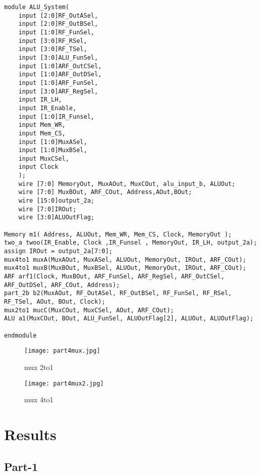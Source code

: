 \documentclass[12pt]{article}
\begin{document}
\begin{lstlisting}
module ALU_System(
    input [2:0]RF_OutASel,
    input [2:0]RF_OutBSel,
    input [1:0]RF_FunSel,
    input [3:0]RF_RSel,
    input [3:0]RF_TSel,
    input [3:0]ALU_FunSel,
    input [1:0]ARF_OutCSel,
    input [1:0]ARF_OutDSel,
    input [1:0]ARF_FunSel,
    input [3:0]ARF_RegSel,
    input IR_LH,
    input IR_Enable,
    input [1:0]IR_Funsel,
    input Mem_WR,
    input Mem_CS,
    input [1:0]MuxASel,
    input [1:0]MuxBSel,
    input MuxCSel,
    input Clock
    );
    wire [7:0] MemoryOut, MuxAOut, MuxCOut, alu_input_b, ALUOut;
    wire [7:0] MuxBOut, ARF_COut, Address,AOut,BOut;
    wire [15:0]output_2a;
    wire [7:0]IROut;
    wire [3:0]ALUOutFlag;
 
Memory m1( Address, ALUOut, Mem_WR, Mem_CS, Clock, MemoryOut );
two_a twoo(IR_Enable, Clock ,IR_Funsel , MemoryOut, IR_LH, output_2a);
assign IROut = output_2a[7:0];
mux4to1 muxA(MuxAOut, MuxASel, ALUOut, MemoryOut, IROut, ARF_COut);
mux4to1 muxB(MuxBOut, MuxBSel, ALUOut, MemoryOut, IROut, ARF_COut); 
ARF arf1(Clock, MuxBOut, ARF_FunSel, ARF_RegSel, ARF_OutCSel, ARF_OutDSel, ARF_COut, Address);
part_2b b2(MuxAOut, RF_OutASel, RF_OutBSel, RF_FunSel, RF_RSel, RF_TSel, AOut, BOut, Clock);
mux2to1 mucC(MuxCOut, MuxCSel, AOut, ARF_COut);
ALU a1(MuxCOut, BOut, ALU_FunSel, ALUOutFlag[2], ALUOut, ALUOutFlag);
   
endmodule
\end{lstlisting}

\begin{figure}[H]
    \centering
    \texttt{[image: part4mux.jpg]}
    \caption{mux 2to1}
    \label{fig:mux1}
\end{figure}

\vspace{1.5cm}
\begin{figure}[H]
    \centering
    \texttt{[image: part4mux2.jpg]}
    \caption{mux 4to1}
    \label{fig:mux2}
\end{figure}



\clearpage

\section{Results}


 \subsection{Part-1}
\end{document}
